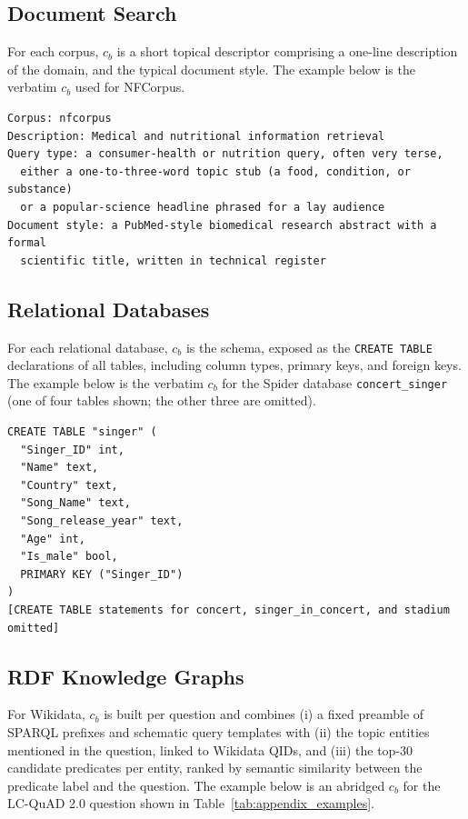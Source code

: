 \documentclass{llmxive}
\begin{document}
{\subsection{Document Search}
\label{sec:appendix_context_search}
For each corpus, $c_b$ is a short topical descriptor comprising a one-line description of the domain, and the typical document style. The example below is the verbatim $c_b$ used for NFCorpus.

\begin{tcolorbox}[colback=gray!5, colframe=gray!50, boxrule=0.5pt, arc=2mm, left=4pt, right=4pt, top=3pt, bottom=3pt]
{\footnotesize
\begin{verbatim}
Corpus: nfcorpus
Description: Medical and nutritional information retrieval
Query type: a consumer-health or nutrition query, often very terse,
  either a one-to-three-word topic stub (a food, condition, or substance)
  or a popular-science headline phrased for a lay audience
Document style: a PubMed-style biomedical research abstract with a formal
  scientific title, written in technical register
\end{verbatim}
}
\end{tcolorbox}

\subsection{Relational Databases}
\label{sec:appendix_context_sql}
For each relational database, $c_b$ is the schema, exposed as the \texttt{CREATE TABLE} declarations of all tables, including column types, primary keys, and foreign keys. The example below is the verbatim $c_b$ for the Spider database \texttt{concert\_singer} (one of four tables shown; the other three are omitted).

\begin{tcolorbox}[colback=gray!5, colframe=gray!50, boxrule=0.5pt, arc=2mm, left=4pt, right=4pt, top=3pt, bottom=3pt]
{\footnotesize
\begin{verbatim}
CREATE TABLE "singer" (
  "Singer_ID" int,
  "Name" text,
  "Country" text,
  "Song_Name" text,
  "Song_release_year" text,
  "Age" int,
  "Is_male" bool,
  PRIMARY KEY ("Singer_ID")
)
[CREATE TABLE statements for concert, singer_in_concert, and stadium omitted]
\end{verbatim}
}
\end{tcolorbox}

\subsection{RDF Knowledge Graphs}
\label{sec:appendix_context_sparql}
For Wikidata, $c_b$ is built per question and combines (i) a fixed preamble of SPARQL prefixes and schematic query templates with (ii) the topic entities mentioned in the question, linked to Wikidata QIDs, and (iii) the top-30 candidate predicates per entity, ranked by semantic similarity between the predicate label and the question. The example below is an abridged $c_b$ for the LC-QuAD 2.0 question shown in Table~\ref{tab:appendix_examples}.

}
\end{document}
